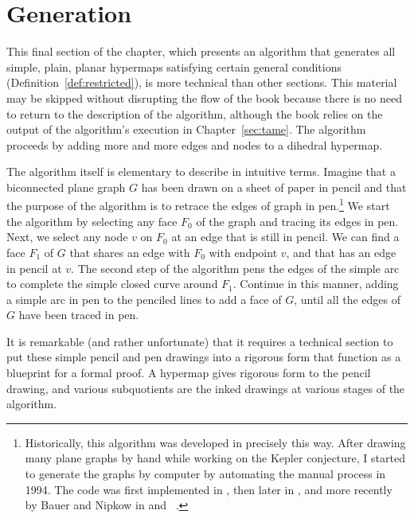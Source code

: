 \section{Generation}\label{sec:generation}
%

This final section of the chapter, which presents an algorithm that
generates all simple, plain, planar hypermaps satisfying certain
general conditions (Definition~\ref{def:restricted}), is more
technical than other sections.  This material may be skipped without
disrupting the flow of the book because there is no need to return to
the description of the algorithm, although the book relies on the
output of the algorithm's execution in  Chapter~\ref{sec:tame}.  The
algorithm proceeds by adding more and more edges and nodes to a
dihedral hypermap.

The algorithm itself is elementary to describe in intuitive terms.
Imagine that a biconnected plane graph $G$ has been drawn on a sheet
of paper in pencil and that the purpose of the algorithm is to retrace
the edges of graph in pen.\footnote{Historically, this algorithm was
  developed in precisely this way.  After drawing many plane graphs by
  hand while working on the Kepler conjecture, I started to generate
  the graphs by computer by automating the manual process in 1994.
  The code was first implemented in , then later
  in , and more recently by Bauer and Nipkow in
   and ~\cite{Nipkow:2005:Tame}.}
We start the algorithm by selecting any face $F_0$ of the graph and
tracing its edges in pen.   Next, we select any node $v$ on $F_0$ at 
an edge that is still in pencil.  We can find a face $F_1$
of $G$ that shares an edge with $F_0$ with endpoint $v$, and that has
an edge in pencil at $v$.  The second step of the algorithm pens the
edges of the simple arc to complete the simple closed curve around
$F_1$.  Continue in this manner, adding a simple arc in pen to the
penciled lines to add a face of $G$, until all the edges of $G$ have
been traced in pen.  %


It is remarkable (and rather unfortunate) that it requires a technical
section to put these simple pencil and pen drawings into a rigorous
form that function as a blueprint for a formal proof.  A hypermap
gives rigorous form to the pencil drawing, and various subquotients
are the inked drawings at various stages of the algorithm.


